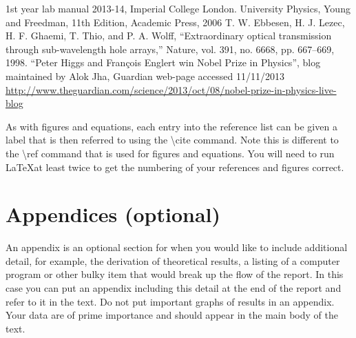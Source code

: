 \documentclass{article}
\begin{document}
\begin{thebibliography}{1}
 1st year lab manual 2013-14, Imperial College London.
 University Physics, Young and Freedman, 11th Edition, Academic Press, 2006
 T. W. Ebbesen, H. J. Lezec, H. F. Ghaemi, T. Thio, and P. A. Wolff, “Extraordinary optical transmission through sub-wavelength hole arrays,” Nature, vol. 391, no. 6668, pp. 667–669,  1998. 
 “Peter Higgs and François Englert win Nobel Prize in Physics”, blog maintained by Alok Jha,  Guardian web-page accessed 11/11/2013 \url{http://www.theguardian.com/science/2013/oct/08/nobel-prize-in-physics-live-blog}
\end{thebibliography}

As with figures and equations, each entry into the reference list can be given a label that is then referred to using the \textbackslash cite{} command.  Note this is different to the \textbackslash ref{} command that is used for figures and equations.  You will need to run \LaTeX at least twice to get the numbering of your references and figures correct.

\section{Appendices (optional)}
An appendix is an optional section for when you would like to include additional detail, for example, the derivation of theoretical results, a listing of a computer program or other bulky item that would break up the flow of the report.  In this case you can put an appendix including this detail at the end of the report and refer to it in the text. Do not put important graphs of results in an appendix. Your data are of prime importance and should appear in the main body of the text. 
\end{document}
